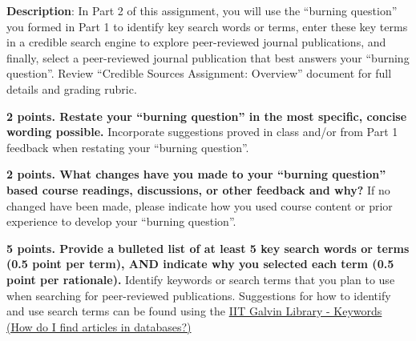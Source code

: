 \documentclass[title={Credible Sources - Literature Review {\&} Article Selection},points={30}]{fdsn201homework}
\begin{document}
\maketitle

\noindent%
\textbf{Description}: In Part 2 of this assignment, you will use the ``burning question'' you formed in Part 1 to identify key search words or terms, enter these key terms in a credible search engine to explore peer-reviewed journal publications, and finally, select a peer-reviewed journal publication that best answers your ``burning question''.
Review ``Credible Sources Assignment: Overview'' document for full details and grading rubric.

\begin{problems}
	\item \textbf{2 points. Restate your ``burning question'' in the most specific, concise wording possible.}
	Incorporate suggestions proved in class and/or from Part 1 feedback when restating your ``burning question''.
	\item \textbf{2 points. What changes have you made to your ``burning question'' based course readings, discussions, or other feedback and why?}
	If no changed have been made, please indicate how you used course content or prior experience to develop your ``burning question''.
	\item \textbf{5 points. Provide a bulleted list of at least 5 key search words or terms (0.5 point per term), AND indicate why you selected each term (0.5 point per rationale).}
	Identify keywords or search terms that you plan to use when searching for peer-reviewed publications.
	Suggestions for how to identify and use search terms can be found using the \href{https://iit.libanswers.com/faq/292350}{IIT Galvin Library - Keywords (How do I find articles in databases?)}
\end{problems}
\end{document}
